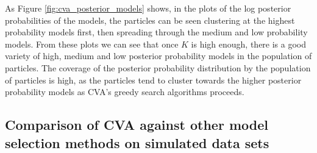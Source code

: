 

As Figure \ref{fig:cva_posterior_models} shows, 
in the plots of the log posterior probabilities of the models, the particles can be seen clustering at the
highest probability models first, then spreading through the medium and low probability models. From these
plots we can see that once $K$ is high enough, there is a good variety of high, medium and low posterior
probability models in the population of particles. The coverage of the posterior probability distribution
by the population of particles is high, as the particles tend to cluster towards the higher posterior
probability models as CVA's greedy search algorithms proceeds.

\subsection{Comparison of CVA against other model selection methods on simulated data sets}

	
		
